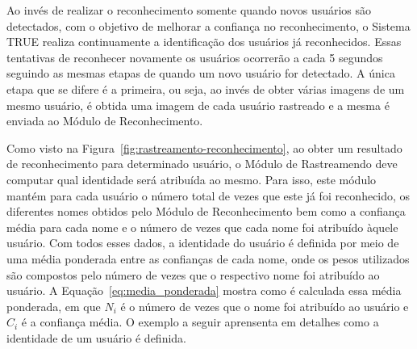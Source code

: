 	
	Ao invés de realizar o reconhecimento somente quando novos usuários são detectados, com o objetivo de melhorar a confiança no reconhecimento, o Sistema TRUE realiza continuamente a identificação dos usuários já reconhecidos. Essas tentativas de reconhecer novamente os usuários ocorrerão a cada 5 segundos seguindo as mesmas etapas de quando um novo usuário for detectado. A única etapa que se difere é a primeira, ou seja, ao invés de obter várias imagens de um mesmo usuário, é obtida uma imagem de cada usuário rastreado e a mesma é enviada ao Módulo de Reconhecimento.

	Como visto na Figura~\ref{fig:rastreamento-reconhecimento}, ao obter um resultado de reconhecimento para determinado usuário, o Módulo de Rastreamendo deve computar qual identidade será atribuída ao mesmo. Para isso, este módulo mantém para cada usuário o número total de vezes que este já foi reconhecido, os diferentes nomes obtidos pelo Módulo de Reconhecimento bem como a confiança média para cada nome e o número de vezes que cada nome foi atribuído àquele usuário. Com todos esses dados, a identidade do usuário é definida por meio de uma média ponderada entre as confianças de cada nome, onde os pesos utilizados são compostos pelo número de vezes que o respectivo nome foi atribuído ao usuário. A Equação~\ref{eq:media_ponderada} mostra como é calculada essa média ponderada, em que $\displaystyle N_i$ é o número de vezes que o nome foi atribuído ao usuário e $\displaystyle C_i$ é a confiança média. O exemplo a seguir aprensenta em detalhes como a identidade de um usuário é definida.

